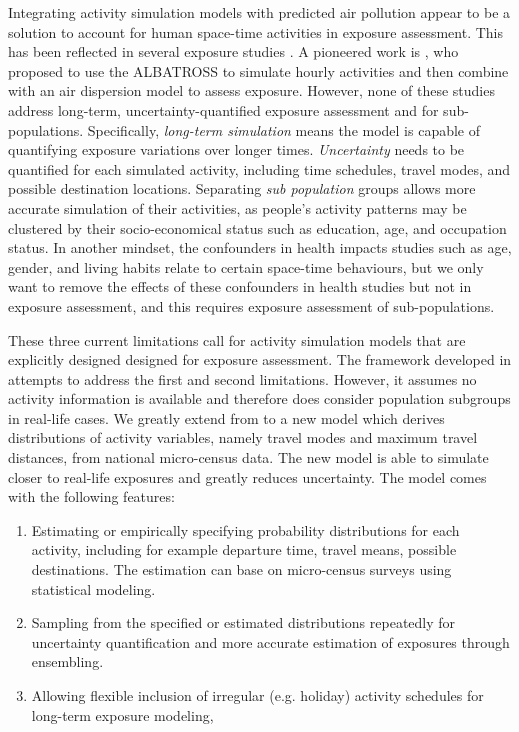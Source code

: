 \documentclass[]{article}
\begin{document}
Integrating activity simulation models with predicted air pollution appear to be a solution to account for human space-time activities in exposure assessment. This has been reflected in several exposure studies \citep{shekarrizfard2017regional,deffner2016personal,gulliver2005time,dons2011impact}. A pioneered work is \cite{beckx2009dynamic}, who proposed to use the ALBATROSS to simulate hourly activities and then combine with an air dispersion model to assess exposure. However, none of these studies address long-term, uncertainty-quantified exposure assessment and for sub-populations. Specifically, \textit{long-term simulation} means the model is capable of quantifying exposure variations over longer times. \textit{Uncertainty} needs to be quantified for each simulated activity, including time schedules, travel modes, and possible destination locations. Separating \textit{sub population} groups allows more accurate simulation of their activities, as people's activity patterns may be clustered by their socio-economical status such as education, age, and occupation status. In another mindset, the confounders in health impacts studies such as age, gender, and living habits relate to certain space-time behaviours, but we only want to remove the effects of these confounders in health studies but not in exposure assessment, and this requires exposure assessment of sub-populations.  

These three current limitations call for activity simulation models that are explicitly designed designed for exposure assessment. The framework developed in \cite{lu2019activity} attempts to address the first and second limitations. However, it assumes no activity information is available and therefore does consider population subgroups in real-life cases. We greatly extend from \cite{lu2019activity} to a new model which derives distributions of activity variables, namely travel modes and maximum travel distances, from national micro-census data. The new model is able to simulate closer to real-life exposures and greatly reduces uncertainty. The model comes with the following features: 

\begin{enumerate}

    \item Estimating or empirically specifying probability distributions for each activity, including for example departure time, travel means, possible destinations. The estimation can base on micro-census surveys using statistical modeling.
    
    \item Sampling from the specified or estimated distributions repeatedly for uncertainty quantification and more accurate estimation of exposures through ensembling. 
    
    \item Allowing flexible inclusion of irregular (e.g. holiday) activity schedules for long-term exposure modeling, 
    
\end{enumerate}
\end{document}

